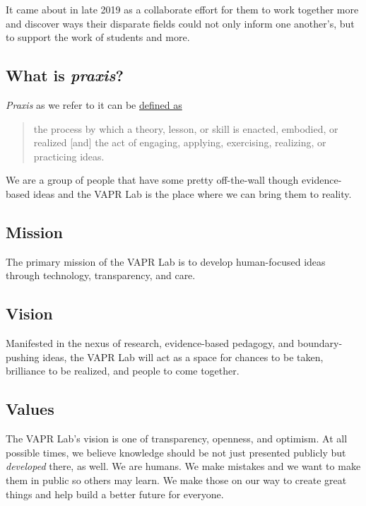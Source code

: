 \documentclass[12pt,]{memoir}
\begin{document}
It came about in late 2019 as a collaborate effort for them to work together more and discover ways their disparate fields could not only inform one another's, but to support the work of students and more.

\hypertarget{what-is-praxis}{%
\subsection*{\texorpdfstring{What is \emph{praxis}?}{What is praxis?}}\label{what-is-praxis}}

\emph{Praxis} as we refer to it can be \href{https://en.wikipedia.org/wiki/Praxis_(process)}{defined as}

\begin{quote}
the process by which a theory, lesson, or skill is enacted, embodied, or realized {[}and{]} the act of engaging, applying, exercising, realizing, or practicing ideas.
\end{quote}

We are a group of people that have some pretty off-the-wall though evidence-based ideas and the VAPR Lab is the place where we can bring them to reality.

\hypertarget{mission}{%
\subsection*{Mission}\label{mission}}

The primary mission of the VAPR Lab is to develop human-focused ideas through technology, transparency, and care.

\hypertarget{vision}{%
\subsection*{Vision}\label{vision}}

Manifested in the nexus of research, evidence-based pedagogy, and boundary-pushing ideas, the VAPR Lab will act as a space for chances to be taken, brilliance to be realized, and people to come together.

\hypertarget{values}{%
\subsection*{Values}\label{values}}

The VAPR Lab's vision is one of transparency, openness, and optimism. At all possible times, we believe knowledge should be not just presented publicly but \emph{developed} there, as well. We are humans. We make mistakes and we want to make them in public so others may learn. We make those on our way to create great things and help build a better future for everyone.
\end{document}
